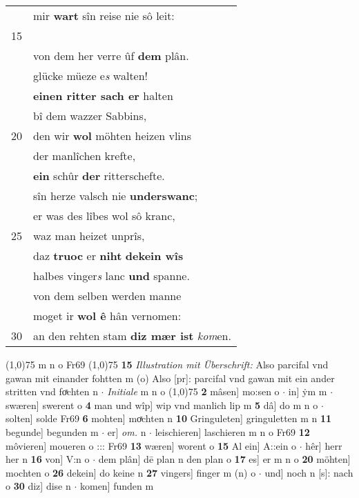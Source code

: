 \documentclass[8pt,a4paper,notitlepage]{article}
\begin{document}
\begin{table}[ht]
\begin{minipage}[t]{0.5\linewidth}
\begin{tabular}{rl}
 & mir \textbf{wart} sîn reise nie sô leit:\\ 
15 & \textbf{\begin{large}A\end{large}l} ein reit mîn hêr Gawan\\ 
 & von dem her verre ûf \textbf{dem} plân.\\ 
 & glücke müeze e\textit{s} walten!\\ 
 & \textbf{einen ritter sach er} halten\\ 
 & bî dem wazzer Sabbins,\\ 
20 & den wir \textbf{wol} möhten heizen vlins\\ 
 & der manlîchen krefte,\\ 
 & \textbf{ein} schûr \textbf{der} ritterschefte.\\ 
 & sîn herze valsch nie \textbf{underswanc};\\ 
 & er was des lîbes wol sô kranc,\\ 
25 & waz man heizet unprîs,\\ 
 & daz \textbf{truoc} er \textbf{niht} \textbf{dekein wîs}\\ 
 & halbes vinger\textit{s} lanc \textbf{und} spanne.\\ 
 & von dem selben werden manne\\ 
 & moget ir \textbf{wol ê} hân vernomen:\\ 
30 & an den rehten stam \textbf{diz mær ist} \textit{kom}en.\\ 
\end{tabular}
\scriptsize
\line(1,0){75} \newline
m n o Fr69 \newline
\line(1,0){75} \newline
\textbf{15} \textit{Illustration mit Überschrift:} Also parcifal vnd gawan mit einander fohtten m (o)  Also [pr]: parcifal vnd gawan mit ein ander stritten vnd foͯchten n   $\cdot$ \textit{Initiale} m n o  \newline
\line(1,0){75} \newline
\textbf{2} mâsen] mo:sen o  $\cdot$ in] ẏm m  $\cdot$ swæren] swerent o \textbf{4} man und wîp] wip vnd manlich lip m \textbf{5} dâ] do m n o  $\cdot$ solten] solde Fr69 \textbf{6} mohten] moͯchten n \textbf{10} Gringuleten] gringuletten m n \textbf{11} begunde] begunden m  $\cdot$ er] \textit{om.} n  $\cdot$ leischieren] laschieren m n o Fr69 \textbf{12} môvieren] moueren o ::: Fr69 \textbf{13} wæren] worent o \textbf{15} Al ein] A::ein o  $\cdot$ hêr] herr her n \textbf{16} von] V:n o  $\cdot$ dem plân] dē plan n den plan o \textbf{17} es] er m n o \textbf{20} möhten] mochten o \textbf{26} dekein] do keine n \textbf{27} vingers] finger m (n) o  $\cdot$ und] noch n [s]: nach o \textbf{30} diz] dise n  $\cdot$ komen] funden m \newline
\end{minipage}
\end{table}
\end{document}
